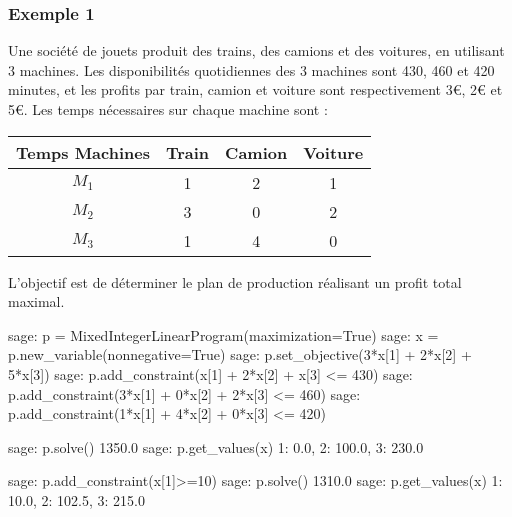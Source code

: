 \documentclass[french]{beamer}
\begin{document}
\begin{frame}\frametitle{Exemple 1}

  Une société de jouets produit des trains, des camions et des voitures, en utilisant 3 machines.
Les disponibilités quotidiennes des 3 machines  sont 430, 460 et 420 minutes, et
les profits par train, camion et voiture sont respectivement 3€, 2€ et 5€. 
Les temps nécessaires sur chaque machine sont :

\begin{center}
\begin{tabular}{|c|c|c|c|}
\hline
 Temps Machines&Train&Camion&Voiture \\
\hline
$M_1$  &1&2&1 \\
\hline
$M_2$  &3&0&2 \\
\hline
$M_3$  &1&4&0 \\
\hline
\end{tabular}
\end{center}

L’objectif est de déterminer le plan de production réalisant un profit total maximal.
\end{frame}




\begin{frame}[fragile]
\begin{pythoncode}
sage: p = MixedIntegerLinearProgram(maximization=True)
sage: x = p.new_variable(nonnegative=True)
sage: p.set_objective(3*x[1] + 2*x[2] + 5*x[3])
sage: p.add_constraint(x[1] + 2*x[2] + x[3] <= 430)
sage: p.add_constraint(3*x[1] + 0*x[2] + 2*x[3] <= 460)
sage: p.add_constraint(1*x[1] + 4*x[2] + 0*x[3] <= 420)
\end{pythoncode}

  \pause

  \begin{pythoncode}
sage: p.solve()
1350.0
sage: p.get_values(x)
{1: 0.0, 2: 100.0, 3: 230.0}
\end{pythoncode}




  
\end{frame}




\begin{frame}[fragile]
\begin{pythoncode}
sage: p.add_constraint(x[1]>=10)
sage: p.solve()
1310.0
sage: p.get_values(x)
{1: 10.0, 2: 102.5, 3: 215.0}
\end{pythoncode}
\end{frame}
\end{document}
